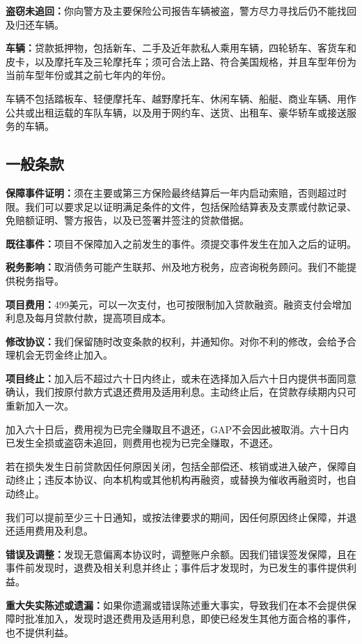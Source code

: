 \documentclass[UTF8,fontset=none,11pt,a4paper]{ctexart}
\begin{document}
\textbf{盗窃未追回：}你向警方及主要保险公司报告车辆被盗，警方尽力寻找后仍不能找回及归还车辆。


\textbf{车辆：}贷款抵押物，包括新车、二手及近年款私人乘用车辆，四轮轿车、客货车和皮卡，以及摩托车及三轮摩托车；须可合法上路、符合美国规格，并且车型年份为当前车型年份或其之前七年内的年份。


车辆不包括踏板车、轻便摩托车、越野摩托车、休闲车辆、船艇、商业车辆、用作公共或出租运载的车队车辆，以及用于网约车、送货、出租车、豪华轿车或接送服务的车辆。


\subsection*{一般条款}
\textbf{保障事件证明：}须在主要或第三方保险最终结算后一年内启动索赔，否则超过时限。我们可以要求足以证明满足条件的文件，包括保险结算表及支票或付款记录、免赔额证明、警方报告，以及已签署并签注的贷款借据。


\textbf{既往事件：}项目不保障加入之前发生的事件。须提交事件发生在加入之后的证明。


\textbf{税务影响：}取消债务可能产生联邦、州及地方税务，应咨询税务顾问。我们不能提供税务指导。


\textbf{项目费用：}499美元，可以一次支付，也可按限制加入贷款融资。融资支付会增加利息及每月贷款付款，提高项目成本。


\textbf{修改协议：}我们保留随时改变条款的权利，并通知你。对你不利的修改，会给予合理机会无罚金终止加入。


\textbf{项目终止：}加入后不超过六十日内终止，或未在选择加入后六十日内提供书面同意确认，我们按原付款方式退还费用及适用利息。主动终止后，在贷款存续期内只可重新加入一次。


加入六十日后，费用视为已完全赚取且不退还，GAP不会因此被取消。六十日内已发生全损或盗窃未追回，则费用也视为已完全赚取，不退还。


若在损失发生日前贷款因任何原因关闭，包括全部偿还、核销或进入破产，保障自动终止；违反本协议、向本机构或其他机构再融资，或替换为催收再融资时，也自动终止。


我们可以提前至少三十日通知，或按法律要求的期间，因任何原因终止保障，并退还适用费用及利息。


\textbf{错误及调整：}发现无意偏离本协议时，调整账户余额。因我们错误签发保障，且在事件前发现时，退费及相关利息并终止；事件后才发现时，为已发生的事件提供利益。


\textbf{重大失实陈述或遗漏：}如果你遗漏或错误陈述重大事实，导致我们在本不会提供保障时批准加入，发现时退还费用及适用利息，即使已经发生其他方面合格的事件，也不提供利益。
\end{document}
